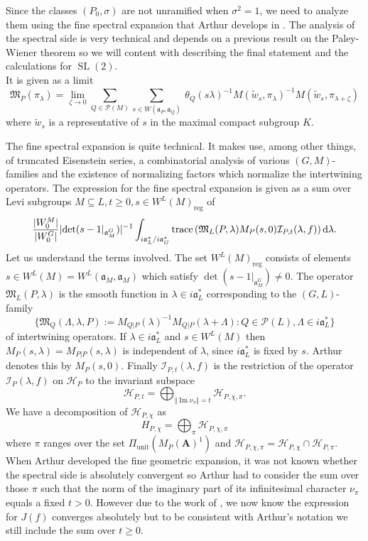 \documentclass[11pt]{amsart}
\def\A{\mathbf A}
\def\HHH{\mathcal H}
\def\III{\mathcal I}
\def\MMM{\mathfrak M}	%
\def\PPP{\mathcal P}
\def\aaa{\mathfrak a}
\def\d{\text d}
\def\det{\operatorname{det}}
\def\Im{\operatorname{Im}}
\def\mod#1{\lvert #1 \rvert} %
\def\norm#1{\Vert #1 \Vert} %
\def\reg{\operatorname{reg}}
\def\sl{\operatorname{SL}}
\def\trace{\operatorname{trace}}
\def\unit{\operatorname{unit}}
\theoremstyle{remark}
\begin{document}
Since the classes $(P_0, \sigma)$ are not unramified when $\sigma^2 = 1$, we need to analyze them using the fine spectral expansion that Arthur develops in \cite{MR681738}. The analysis of the spectral side is very technical and depends on a previous result on the Paley-Wiener theorem \cite{MR697608} so we will content with describing the final statement and the calculations for $\sl(2)$. 
\\[5em]







It is given as a limit
\[ \MMM_P(\pi_\lambda) = \lim_{\zeta \to 0} \sum_{Q \in \PPP(M)} \sum_{s \in W(\aaa_P, \aaa_Q)} \
		\theta_Q(s\lambda)^{-1} M(\tilde w_s, \pi_\lambda)^{-1} M(\tilde w_s, \pi_{\lambda + \zeta}) \]
where $\tilde w_s$ is a representative of $s$ in the maximal compact subgroup $K$. 

The fine spectral expansion is quite technical. It makes use, among other things, of truncated Eisenstein series, a combinatorial analysis of various $(G, M)$-families and the existence of normalizing factors which normalize the intertwining operators. The expression for the fine spectral expansion is given as a sum over Levi subgroups $M \subseteq L, t \geq 0, s \in W^L(M)_{\reg}$ of 
\[ 
	\frac{\mod{W_0^M}}{\mod{W_0^G}} \mod{\det(s - 1|_{\aaa_M^G})}^{-1} 
		\int_{i\aaa_L^* / i\aaa_G^*} \trace \left( \MMM_L(P, \lambda) M_P(s, 0) \III_{P, t}(\lambda, f) \right) \d \lambda. 
\]
Let us understand the terms involved. The set $W^L(M)_{\reg}$ consists of elements $s \in W^L(M) = W^L(\aaa_M, \aaa_M)$ which satisfy $\det(s-1|_{\aaa_M^G}) \neq 0$. The operator $\MMM_L(P, \lambda)$ is the smooth function in $\lambda \in i\aaa_L^*$ corresponding to the $(G, L)$-family 
\[ \{ \MMM_Q(\Lambda, \lambda, P) := M_{Q|P}(\lambda)^{-1} M_{Q|P}(\lambda + \Lambda) : Q \in \PPP(L), \Lambda \in i\aaa_L^* \} \]
of intertwining operators. If $\lambda \in i\aaa_L^*$ and $s \in W^L(M)$ then $M_P(s, \lambda) = M_{P|P}(s, \lambda)$ is independent of $\lambda$, since $i\aaa_L^*$ is fixed by $s$. Arthur denotes this by $M_P(s, 0)$. Finally $\III_{P, t}(\lambda, f)$ is the restriction of the operator $\III_P(\lambda, f)$ on $\HHH_P$ to the invariant subspace 
\[ \HHH_{P, t} = \bigoplus_{\norm{\Im \nu_\pi} = t} \HHH_{P, \chi, \pi}. \]
We have a decomposition of $\HHH_{P, \chi}$ as
\[ H_{P, \chi} = \bigoplus_\pi \HHH_{P, \chi, \pi} \]
where $\pi$ ranges over the set $\Pi_{\unit}(M_P(\A)^1)$ and $\HHH_{P, \chi, \pi} = \HHH_{P, \chi} \cap \HHH_{P, \pi}$. When Arthur developed the fine geometric expansion, it was not known whether the spectral side is absolutely convergent so Arthur had to consider the sum over those $\pi$ such that the norm of the imaginary part of its infinitesimal character $\nu_\pi$ equals a fixed $t > 0$. However due to the work of \cite{FLM}, we now know the expression for $J(f)$ converges absolutely but to be consistent with Arthur's notation we still include the sum over $t \geq 0$. 
\end{document}
